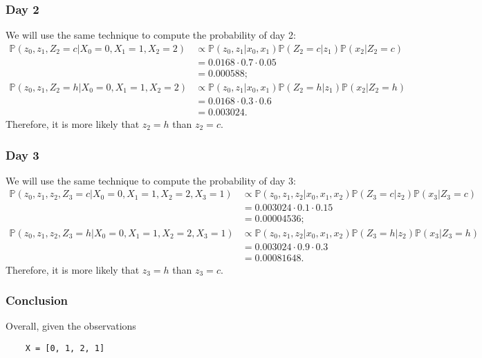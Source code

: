 \documentclass{article}
\theoremstyle{definition}
\renewcommand{\P}{\mathbb{P}}
\begin{document}
\subsubsection{Day 2}

We will use the same technique to compute the probability of day 2:
\begin{align*}
    \P(z_0, z_1, Z_2 = c | X_0 = 0, X_1 = 1, X_2 = 2) &\propto \P(z_0, z_1|x_0, x_1) \P(Z_2 = c |z_1) \P(x_2 | Z_2 = c) \\
    &= 0.0168 \cdot 0.7 \cdot 0.05 \\
    &= 0.000588; \\
    \P(z_0, z_1, Z_2 = h | X_0 = 0, X_1 = 1, X_2 = 2) &\propto \P(z_0, z_1|x_0, x_1) \P(Z_2 = h |z_1) \P(x_2 | Z_2 = h) \\
    &= 0.0168 \cdot 0.3 \cdot 0.6 \\
    &= 0.003024.
\end{align*}
Therefore, it is more likely that \(z_2 = h\) than \(z_2 = c\).

\subsubsection{Day 3}

We will use the same technique to compute the probability of day 3:
\begin{align*}
    \P(z_0, z_1, z_2, Z_3 = c | X_0 = 0, X_1 = 1, X_2 = 2, X_3 = 1) &\propto \P(z_0, z_1, z_2|x_0, x_1, x_2) \P(Z_3 = c |z_2) \P(x_3 | Z_3 = c) \\
    &= 0.003024 \cdot 0.1 \cdot 0.15 \\
    &= 0.00004536; \\
    \P(z_0, z_1, z_2, Z_3 = h | X_0 = 0, X_1 = 1, X_2 = 2, X_3 = 1) &\propto \P(z_0, z_1, z_2|x_0, x_1, x_2) \P(Z_3 = h |z_2) \P(x_3 | Z_3 = h) \\
    &= 0.003024 \cdot 0.9 \cdot 0.3 \\
    &= 0.00081648.
\end{align*}
Therefore, it is more likely that \(z_3 = h\) than \(z_3 = c\).

\subsubsection{Conclusion}

Overall, given the observations

\begin{verbatim}
    X = [0, 1, 2, 1]
\end{verbatim}
\end{document}
